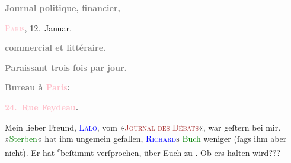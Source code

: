 \pstart
           \begin{otherlanguage}{french}\textcolor{gray}{\textbf{Journal politique, financier,}}\end{otherlanguage}\hfill \textsc{\textcolor{pink}{Paris}{}\ledrightnote{\textcolor{pink}{Paris}}}, 12. Januar.\pend
           
\pstart
           \begin{otherlanguage}{french}\textcolor{gray}{\textbf{commercial et littéraire.}}\end{otherlanguage}\pend
           
\pstart
           \begin{otherlanguage}{french}\textcolor{gray}{\textbf{\textbf{Paraissant trois fois par jour.}}}\end{otherlanguage}\pend
           
\pstart
           \begin{otherlanguage}{french}\textcolor{gray}{\textbf{\textbf{Bureau à \textcolor{pink}{Paris}{}\ledrightnote{\textcolor{pink}{Paris}}:}}}\end{otherlanguage}\pend
           
\pstart
           \begin{otherlanguage}{french}\textcolor{gray}{\textbf{\textbf{\textcolor{pink}{24. Rue Feydeau}{}\ledrightnote{\textcolor{pink}{rue Feydeau}}.}}}\end{otherlanguage}\pend
           
\pstart{}Mein lieber Freund,\pend
\pstart
           \textsc{\textcolor{blue}{Lalo}{}\ledrightnote{\textcolor{blue}{Pierre Lalo}}}, vom »\textsc{\textcolor{brown}{Journal des Débats}{}\ledrightnote{\textcolor{brown}{Journal des débats}}}«, war geſtern bei mir. »\textcolor{green}{Sterben}{}\ledrightnote{\textcolor{green}{Sterben. Novelle}}« hat ihm ungemein gefallen, \textsc{\textcolor{blue}{Richard}{}\ledrightnote{\textcolor{blue}{Richard Beer-Hofmann}}s}{ }\textcolor{green}{Buch}{}\ledrightnote{{$\rightarrow$}\textcolor{green}{Novellen}} weniger
               (ſags ihm aber nicht). Er hat \substVorne{}\textsuperscript{e}\substDazwischen{}b\substHinten{}eſtimmt verſprochen, über Euch zu \label{K_L02727-1v}\label{K_L02727-1h}. Ob ers
               halten wird???\pend
           
